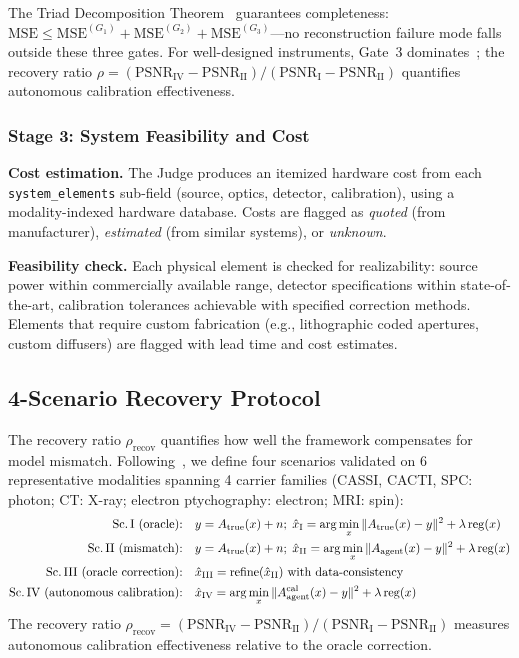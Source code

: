 \documentclass[11pt,a4paper]{article}
\newcommand{\Atrue}{A_{\text{true}}}
\newcommand{\Aagent}{A_{\text{agent}}}
\begin{document}
The Triad Decomposition Theorem~\cite{paperII} guarantees completeness: $\text{MSE} \leq \text{MSE}^{(G_1)} + \text{MSE}^{(G_2)} + \text{MSE}^{(G_3)}$---no reconstruction failure mode falls outside these three gates.  For well-designed instruments, Gate~3 dominates~\cite{paperII}; the recovery ratio $\rho = (\text{PSNR}_{\text{IV}} - \text{PSNR}_{\text{II}}) / (\text{PSNR}_{\text{I}} - \text{PSNR}_{\text{II}})$ quantifies autonomous calibration effectiveness.

\subsubsection{Stage 3: System Feasibility and Cost}

\textbf{Cost estimation.}  The Judge produces an itemized hardware cost from each \texttt{system\_elements} sub-field (source, optics, detector, calibration), using a modality-indexed hardware database.  Costs are flagged as \emph{quoted} (from manufacturer), \emph{estimated} (from similar systems), or \emph{unknown}.

\textbf{Feasibility check.}  Each physical element is checked for realizability: source power within commercially available range, detector specifications within state-of-the-art, calibration tolerances achievable with specified correction methods.  Elements that require custom fabrication (e.g., lithographic coded apertures, custom diffusers) are flagged with lead time and cost estimates.

\subsection{4-Scenario Recovery Protocol}

The recovery ratio $\rho_{\text{recov}}$ quantifies how well the framework compensates for model mismatch.  Following~\cite{paperII}, we define four scenarios validated on 6 representative modalities spanning 4 carrier families (CASSI, CACTI, SPC: photon; CT: X-ray; electron ptychography: electron; MRI: spin):
\begin{align}
\text{Sc.\,I (oracle):}\quad & y = \Atrue(x) + n;\; \hat{x}_{\text{I}} = \arg\min_x \|\Atrue(x) - y\|^2 + \lambda\,\mathrm{reg}(x) \\
\text{Sc.\,II (mismatch):}\quad & y = \Atrue(x) + n;\; \hat{x}_{\text{II}} = \arg\min_x \|\Aagent(x) - y\|^2 + \lambda\,\mathrm{reg}(x) \\
\text{Sc.\,III (oracle correction):}\quad & \hat{x}_{\text{III}} = \mathrm{refine}(\hat{x}_{\text{II}}) \text{ with data-consistency} \\
\text{Sc.\,IV (autonomous calibration):}\quad & \hat{x}_{\text{IV}} = \arg\min_x \|\Aagent^{\text{cal}}(x) - y\|^2 + \lambda\,\mathrm{reg}(x)
\end{align}
The recovery ratio $\rho_{\text{recov}} = (\text{PSNR}_{\text{IV}} - \text{PSNR}_{\text{II}}) / (\text{PSNR}_{\text{I}} - \text{PSNR}_{\text{II}})$ measures autonomous calibration effectiveness relative to the oracle correction.
\end{document}
